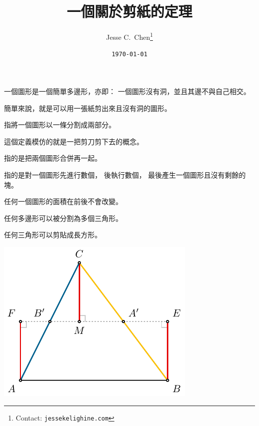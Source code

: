 \documentclass{article}
\title{一個關於剪紙的定理}
\author{Jesse C.\ Chen\thanks{Contact: \texttt{jessekelighine.com}}}
\date{\texttt{\today}}
\begin{document}
\begin{multicols*}{2}

\maketitle

\noindent

\begin{definition}[圖形]
	一個圖形是一個簡單多邊形，亦即：
	一個圖形沒有洞，並且其邊不與自己相交。
\end{definition}
\begin{remark}
	簡單來說，就是可以用一張紙剪出來且沒有洞的圖形。
\end{remark}

\begin{definition}[剪]
	指將一個圖形以一條分割成兩部分。
\end{definition}
\begin{remark}
	這個定義模仿的就是一把剪刀剪下去的概念。
\end{remark}

\begin{definition}[貼]
	指的是把兩個圖形合併再一起。
\end{definition}

\begin{definition}[剪貼]
	指的是對一個圖形先進行數個，
	後執行數個，
	最後產生一個圖形且沒有剩餘的塊。
\end{definition}
\begin{remark}
	任何一個圖形的面積在前後不會改變。
\end{remark}

\begin{theorem}
	任何多邊形可以被分割為多個三角形。
\end{theorem}

\begin{theorem}
	任何三角形可以剪貼成長方形。
\end{theorem}

\begin{center}
	\includegraphics[scale=1]{figures/figure-triangle_to_rectangle.pdf}
\end{center}


\end{multicols*}
\end{document}
